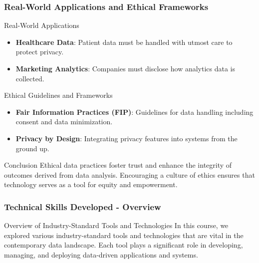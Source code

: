\documentclass[aspectratio=169]{beamer}
\begin{document}
\begin{frame}[fragile]
    \frametitle{Real-World Applications and Ethical Frameworks}
    \begin{block}{Real-World Applications}
        \begin{itemize}
            \item \textbf{Healthcare Data}: Patient data must be handled with utmost care to protect privacy.
            \item \textbf{Marketing Analytics}: Companies must disclose how analytics data is collected.
        \end{itemize}
    \end{block}

    \begin{block}{Ethical Guidelines and Frameworks}
        \begin{itemize}
            \item \textbf{Fair Information Practices (FIP)}: Guidelines for data handling including consent and data minimization.
            \item \textbf{Privacy by Design}: Integrating privacy features into systems from the ground up.
        \end{itemize}
    \end{block}

    \begin{block}{Conclusion}
        Ethical data practices foster trust and enhance the integrity of outcomes derived from data analysis. 
        Encouraging a culture of ethics ensures that technology serves as a tool for equity and empowerment.
    \end{block}
\end{frame}

\begin{frame}[fragile]
    \frametitle{Technical Skills Developed - Overview}
    \begin{block}{Overview of Industry-Standard Tools and Technologies}
        In this course, we explored various industry-standard tools and technologies that are vital in the contemporary data landscape. Each tool plays a significant role in developing, managing, and deploying data-driven applications and systems.
    \end{block}
\end{frame}
\end{document}
